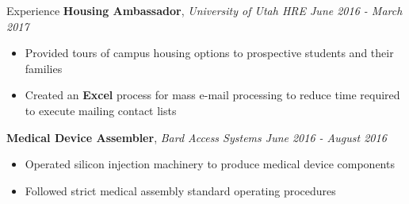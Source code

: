\documentclass{resume/resume}
\begin{document}
\begin{rSection}{Experience}
    {\bf Housing Ambassador}, {\em University of Utah HRE \hfill June 2016 - March 2017}
    \vspace{-6pt}
    \begin{itemize}[nosep]
        \item Provided tours of campus housing options to prospective students and their families
        \item Created an {\bf Excel} process for mass e-mail processing to reduce time required to execute mailing contact lists
    \end{itemize}
    
    {\bf Medical Device Assembler}, {\em Bard Access Systems \hfill June 2016 - August 2016}
    \vspace{-6pt}
    \begin{itemize}[nosep]
        \item Operated silicon injection machinery to produce medical device components
        \item Followed strict medical assembly standard operating procedures
    \end{itemize}
    
\end{rSection}


\end{document}
